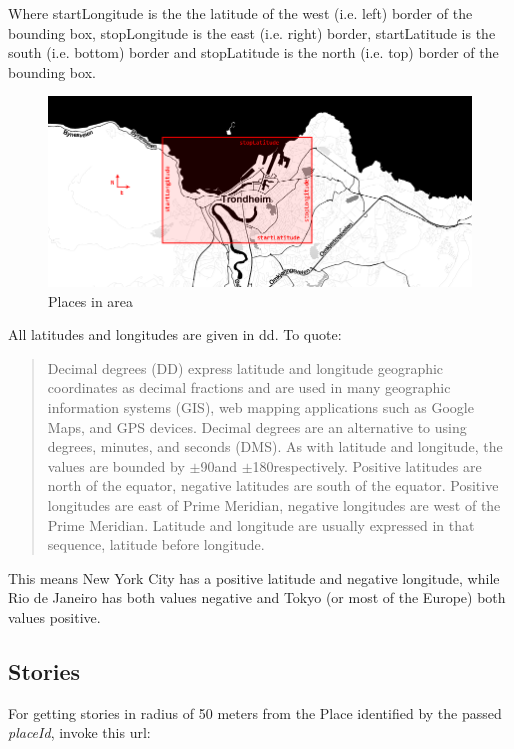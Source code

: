\documentclass[11pt]{book}
\begin{document}
Where startLongitude is the the latitude of the west (i.e. left) border of the bounding box, stopLongitude is the east (i.e. right) border, startLatitude is the south (i.e. bottom) border and stopLatitude is the north (i.e. top) border of the bounding box.

\begin{figure}[H]
      \centering
      \includegraphics[width=1.0\textwidth]{Figures/Architecture/placesRange.png}
      \caption{Places in area}
      \label{fig:arch_interface_map}
\end{figure}

All latitudes and longitudes are given in \gls{dd}. To quote:

\begin{quotation}\noindent
Decimal degrees (DD) express latitude and longitude geographic coordinates as decimal fractions and are used in many geographic information systems (GIS), web mapping applications such as Google Maps, and GPS devices. Decimal degrees are an alternative to using degrees, minutes, and seconds (DMS). As with latitude and longitude, the values are bounded by $\pm$90\degree and $\pm$180\degree respectively. Positive latitudes are north of the equator, negative latitudes are south of the equator. Positive longitudes are east of Prime Meridian, negative longitudes are west of the Prime Meridian. Latitude and longitude are usually expressed in that sequence, latitude before longitude.\cite{decimalDegrees}
\end{quotation}

This means New York City has a positive latitude and negative longitude, while Rio de Janeiro has both values negative and Tokyo (or most of the Europe) both values positive.

\subsection{Stories}
For getting stories in radius of 50 meters from the Place identified by the passed \textit{placeId}, invoke this \gls{url}:
\end{document}

